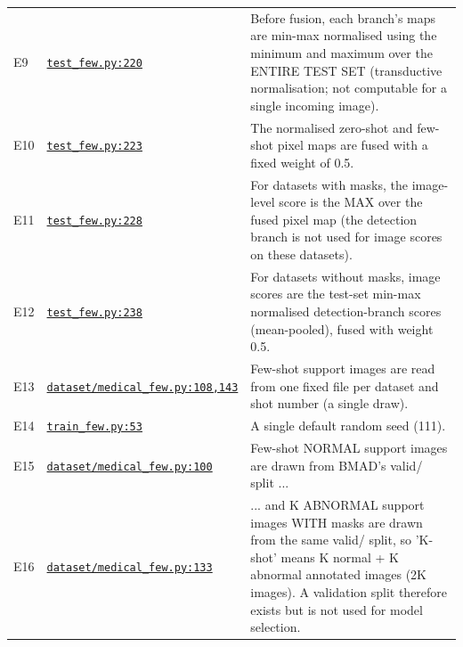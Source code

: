\documentclass[11pt,a4paper]{article}
\begin{document}
{\begin{longtable}{@{}l P{3.6cm} P{10.8cm}@{}}
E9 & \href{https://github.com/MediaBrain-SJTU/MVFA-AD/blob/a30bf7bb2c51772a36e7be58d3c072be480620fe/test_few.py#L220}{\texttt{test\_\allowbreak{}few.py:220}} & Before fusion, each branch's maps are min-max normalised using the minimum and maximum over the ENTIRE TEST SET (transductive normalisation; not computable for a single incoming image).\\
E10 & \href{https://github.com/MediaBrain-SJTU/MVFA-AD/blob/a30bf7bb2c51772a36e7be58d3c072be480620fe/test_few.py#L223}{\texttt{test\_\allowbreak{}few.py:223}} & The normalised zero-shot and few-shot pixel maps are fused with a fixed weight of 0.5.\\
E11 & \href{https://github.com/MediaBrain-SJTU/MVFA-AD/blob/a30bf7bb2c51772a36e7be58d3c072be480620fe/test_few.py#L228}{\texttt{test\_\allowbreak{}few.py:228}} & For datasets with masks, the image-level score is the MAX over the fused pixel map (the detection branch is not used for image scores on these datasets).\\
E12 & \href{https://github.com/MediaBrain-SJTU/MVFA-AD/blob/a30bf7bb2c51772a36e7be58d3c072be480620fe/test_few.py#L238}{\texttt{test\_\allowbreak{}few.py:238}} & For datasets without masks, image scores are the test-set min-max normalised detection-branch scores (mean-pooled), fused with weight 0.5.\\
E13 & \href{https://github.com/MediaBrain-SJTU/MVFA-AD/blob/a30bf7bb2c51772a36e7be58d3c072be480620fe/dataset/medical_few.py#L108}{\texttt{dataset/\allowbreak{}medical\_\allowbreak{}few.py:108,143}} & Few-shot support images are read from one fixed file per dataset and shot number (a single draw).\\
E14 & \href{https://github.com/MediaBrain-SJTU/MVFA-AD/blob/a30bf7bb2c51772a36e7be58d3c072be480620fe/train_few.py#L53}{\texttt{train\_\allowbreak{}few.py:53}} & A single default random seed (111).\\
E15 & \href{https://github.com/MediaBrain-SJTU/MVFA-AD/blob/a30bf7bb2c51772a36e7be58d3c072be480620fe/dataset/medical_few.py#L100}{\texttt{dataset/\allowbreak{}medical\_\allowbreak{}few.py:100}} & Few-shot NORMAL support images are drawn from BMAD's valid/ split ...\\
E16 & \href{https://github.com/MediaBrain-SJTU/MVFA-AD/blob/a30bf7bb2c51772a36e7be58d3c072be480620fe/dataset/medical_few.py#L133}{\texttt{dataset/\allowbreak{}medical\_\allowbreak{}few.py:133}} & ... and K ABNORMAL support images WITH masks are drawn from the same valid/ split, so 'K-shot' means K normal + K abnormal annotated images (2K images). A validation split therefore exists but is not used for model selection.\\

\end{longtable}}
\end{document}
